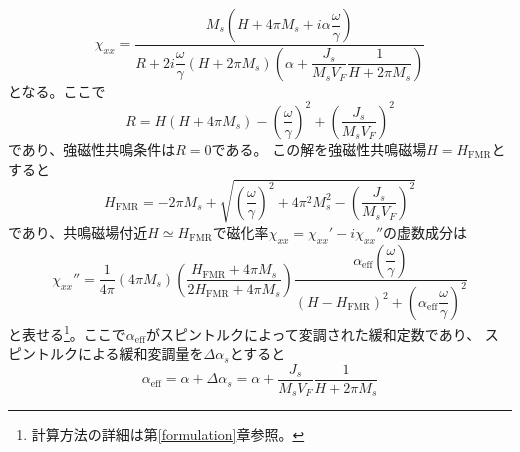 \begin{equation}
\chi_{xx}=\frac{M_s\left(H + 4\pi {M_s} + i\alpha \dfrac{\omega }{\gamma }\right)}{R +2i \dfrac{\omega }{\gamma }(H + 2\pi {M_s})\left( {\alpha  + \dfrac{{{J_s}}}{{{M_s}{V_F}}}\dfrac{1}{{H + 2\pi {M_s}}}} \right)}
\end{equation}
となる。ここで
\begin{equation}
R=H(H + 4\pi {M_s}) - {\left( {\frac{\omega }{\gamma }} \right)^2} + {\left( {\frac{{{J_s}}}{{{M_s}{V_F}}}} \right)^2}\label{resoresocon}
\end{equation}
であり、強磁性共鳴条件は$R=0$である。
この解を強磁性共鳴磁場$H=H_\text{FMR}$とすると
\begin{equation}
H_\text{FMR}=-2\pi M_s+\sqrt{\left( \frac{\omega}{\gamma}\right)^2+4\pi^2 M_s^2-\left( {\frac{{{J_s}}}{{{M_s}{V_F}}}} \right)^2}
\end{equation}
であり、共鳴磁場付近$H\simeq H_\text{FMR}$で磁化率$\chi_{xx}=\chi_{xx}'-i\chi_{xx}''$の虚数成分は
\begin{equation}
\chi_{xx}'' = \frac{1}{4\pi}(4\pi {M_s})  \left(\frac{{ {{H_\text{FMR}} + 4\pi {M_s}}  }}{  2H _\text{FMR}+ 4\pi {M_s} }\right)\frac{\alpha_\text{eff}  \left(\dfrac{\omega}{\gamma}\right)}{ { {{(H - {H_\text{FMR}})}^2}+\left( \alpha_\text{eff} \dfrac{\omega}{\gamma}\right)^2 } }
\end{equation}
と表せる\footnote{計算方法の詳細は第\ref{formulation}章参照。}。ここで$\alpha_\text{eff}$がスピントルクによって変調された緩和定数であり、
スピントルクによる緩和変調量を$\Delta \alpha_s$とすると
\begin{equation}
\alpha_\text{eff}=\alpha  + \Delta\alpha_s=\alpha+\frac{{{J_s}}}{{{M_s}{V_F}}}\frac{1}{{H + 2\pi {M_s}}}
\end{equation}
